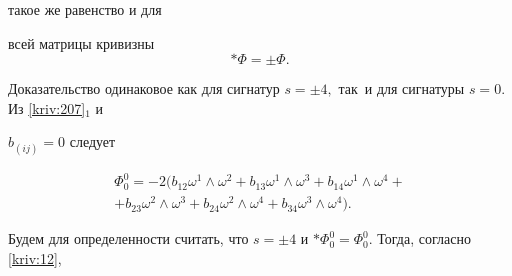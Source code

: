 такое же равенство и для 

всей матрицы кривизны\begin{equation}

\ast \Phi =\pm \Phi .  \label{kriv:208}

\end{equation}

Доказательство одинаковое  как для сигнатур $s=\pm 4,$ так\  и для сигнатуры $s=0.$ Из \eqref{kriv:207}$_{1}$ и 

$b_{\left( ij\right) }=0$ следует









\begin{multline*}

\Phi _{0}^{0}=-2\bigl( 


b_{12}\omega ^{1}\wedge \omega ^{2}+b_{13}\omega ^{1}\wedge \omega

^{3}+b_{14}\omega ^{1}\wedge \omega ^{4}+ \\ 

+b_{23}\omega ^{2}\wedge \omega ^{3}+b_{24}\omega ^{2}\wedge \omega

^{4}+b_{34}\omega ^{3}\wedge \omega ^{4}


\bigr) .

\end{multline*}

Будем для определенности считать, что $s=\pm 4$ и $\ast \Phi _{0}^{0}=\Phi _{0}^{0}.$ Тогда, согласно \eqref{kriv:12},


